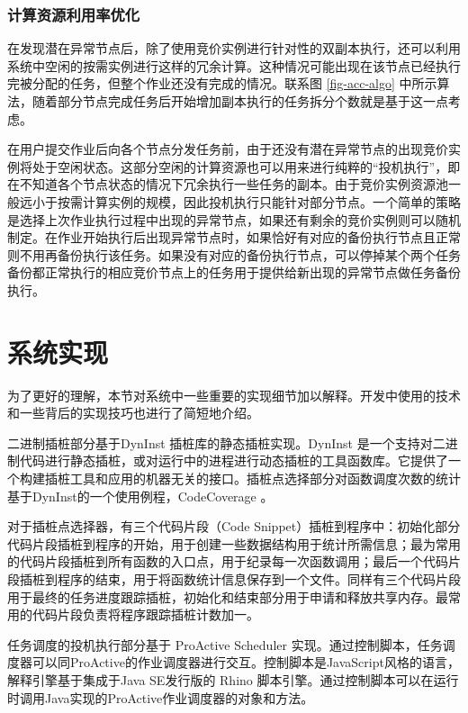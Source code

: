 \subsubsection{计算资源利用率优化}
在发现潜在异常节点后，除了使用竞价实例进行针对性的双副本执行，还可以利用系统中空闲的按需实例进行这样的冗余计算。这种情况可能出现在该节点已经执行完被分配的任务，但整个作业还没有完成的情况。联系图 \ref{fig-acc-algo} 中所示算法，随着部分节点完成任务后开始增加副本执行的任务拆分个数就是基于这一点考虑。

在用户提交作业后向各个节点分发任务前，由于还没有潜在异常节点的出现竞价实例将处于空闲状态。这部分空闲的计算资源也可以用来进行纯粹的``投机执行''，即在不知道各个节点状态的情况下冗余执行一些任务的副本。由于竞价实例资源池一般远小于按需计算实例的规模，因此投机执行只能针对部分节点。一个简单的策略是选择上次作业执行过程中出现的异常节点，如果还有剩余的竞价实例则可以随机制定。在作业开始执行后出现异常节点时，如果恰好有对应的备份执行节点且正常则不用再备份执行该任务。如果没有对应的备份执行节点，可以停掉某个两个任务备份都正常执行的相应竞价节点上的任务用于提供给新出现的异常节点做任务备份执行。

\section{系统实现}
\label{subsec:no2_impl}
为了更好的理解，本节对系统中一些重要的实现细节加以解释。开发中使用的技术和一些背后的实现技巧也进行了简短地介绍。

二进制插桩部分基于DynInst \cite{Dyninst-Deconstruction} 插桩库的静态插桩实现。DynInst 是一个支持对二进制代码进行静态插桩，或对运行中的进程进行动态插桩的工具函数库。它提供了一个构建插桩工具和应用的机器无关的接口。插桩点选择部分对函数调度次数的统计基于DynInst的一个使用例程，CodeCoverage \cite{codecoverage}。
	
对于插桩点选择器，有三个代码片段（Code Snippet）插桩到程序中：初始化部分代码片段插桩到程序的开始，用于创建一些数据结构用于统计所需信息；最为常用的代码片段插桩到所有函数的入口点，用于纪录每一次函数调用；最后一个代码片段插桩到程序的结束，用于将函数统计信息保存到一个文件。同样有三个代码片段用于最终的任务进度跟踪插桩，初始化和结束部分用于申请和释放共享内存。最常用的代码片段负责将程序跟踪插桩计数加一。

任务调度的投机执行部分基于 ProActive Scheduler \cite{pascheduling} 实现。通过控制脚本，任务调度器可以同ProActive的作业调度器进行交互。控制脚本是JavaScript风格的语言，解释引擎基于集成于Java SE发行版的 Rhino \cite{Rhino:2016} 脚本引擎。通过控制脚本可以在运行时调用Java实现的ProActive作业调度器的对象和方法。

